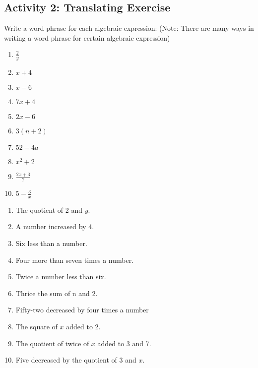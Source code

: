 \subsection*{Activity 2: Translating Exercise}
Write a word phrase for each algebraic expression: (Note: There are many ways in writing a word
phrase for certain algebraic expression)
\begin{enumerate}
\item $\frac{2}{y}$
\item $x + 4$
\item $x-6$
\item $7x + 4$
\item $2x-6$
\item $3(n + 2)$
\item $52-4a$
\item $x^2+2$
\item $\frac{2x+3}{7}$
\item $5-\frac{3}{x}$
\end{enumerate}
\Answers
\begin{enumerate}
\item The quotient of 2 and $y$.
\item A number increased by 4.
\item Six less than a number.
\item Four more than seven times a number.
\item Twice a number less than six.
\item Thrice the sum of n and 2.
\item Fifty-two decreased by four times a number
\item The square of $x$ added to 2.
\item The quotient of twice of $x$ added to 3 and 7.
\item Five decreased by the quotient of 3 and $x$.
\end{enumerate}
